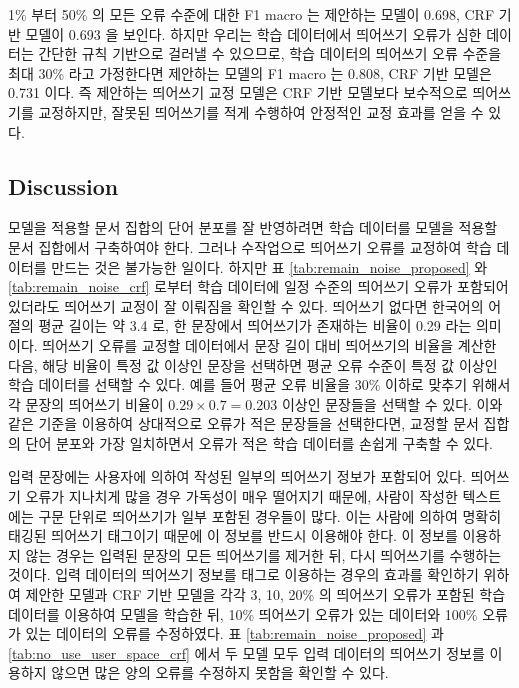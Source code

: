 \documentclass[11pt]{article}
\begin{document}
1\% 부터 50\% 의 모든 오류 수준에 대한 F1 macro 는 제안하는 모델이 0.698, CRF 기반 모델이 0.693 을 보인다.
하지만 우리는 학습 데이터에서 띄어쓰기 오류가 심한 데이터는 간단한 규칙 기반으로 걸러낼 수 있으므로, 학습 데이터의 띄어쓰기 오류 수준을 최대 30\% 라고 가정한다면 제안하는 모델의 F1 macro 는 0.808, CRF 기반 모델은 0.731 이다.
즉 제안하는 띄어쓰기 교정 모델은 CRF 기반 모델보다 보수적으로 띄어쓰기를 교정하지만, 잘못된 띄어쓰기를 적게 수행하여 안정적인 교정 효과를 얻을 수 있다.

\subsection{Discussion}

모델을 적용할 문서 집합의 단어 분포를 잘 반영하려면 학습 데이터를 모델을 적용할 문서 집합에서 구축하여야 한다.
그러나 수작업으로 띄어쓰기 오류를 교정하여 학습 데이터를 만드는 것은 불가능한 일이다.
하지만 표 \ref{tab:remain_noise_proposed} 와 \ref{tab:remain_noise_crf} 로부터 학습 데이터에 일정 수준의 띄어쓰기 오류가 포함되어 있더라도 띄어쓰기 교정이 잘 이뤄짐을 확인할 수 있다.
띄어쓰기 없다면 한국어의 어절의 평균 길이는 약 3.4 로, 한 문장에서 띄어쓰기가 존재하는 비율이 0.29 라는 의미이다.
띄어쓰기 오류를 교정할 데이터에서 문장 길이 대비 띄어쓰기의 비율을 계산한 다음, 해당 비율이 특정 값 이상인 문장을 선택하면 평균 오류 수준이 특정 값 이상인 학습 데이터를 선택할 수 있다.
예를 들어 평균 오류 비율을 30\% 이하로 맞추기 위해서 각 문장의 띄어쓰기 비율이 $0.29 \times 0.7 = 0.203$ 이상인 문장들을 선택할 수 있다.
이와 같은 기준을 이용하여 상대적으로 오류가 적은 문장들을 선택한다면, 교정할 문서 집합의 단어 분포와 가장 일치하면서 오류가 적은 학습 데이터를 손쉽게 구축할 수 있다.

입력 문장에는 사용자에 의하여 작성된 일부의 띄어쓰기 정보가 포함되어 있다.
띄어쓰기 오류가 지나치게 많을 경우 가독성이 매우 떨어지기 때문에, 사람이 작성한 텍스트에는 구문 단위로 띄어쓰기가 일부 포함된 경우들이 많다.
이는 사람에 의하여 명확히 태깅된 띄어쓰기 태그이기 때문에 이 정보를 반드시 이용해야 한다.
이 정보를 이용하지 않는 경우는 입력된 문장의 모든 띄어쓰기를 제거한 뒤, 다시 띄어쓰기를 수행하는 것이다.
입력 데이터의 띄어쓰기 정보를 태그로 이용하는 경우의 효과를 확인하기 위하여 제안한 모델과 CRF 기반 모델을 각각 3, 10, 20\% 의 띄어쓰기 오류가 포함된 학습 데이터를 이용하여 모델을 학습한 뒤, 10\% 띄어쓰기 오류가 있는 데이터와 100\% 오류가 있는 데이터의 오류를 수정하였다.
표 \ref{tab:remain_noise_proposed} 과 \ref{tab:no_use_user_space_crf} 에서 두 모델 모두 입력 데이터의 띄어쓰기 정보를 이용하지 않으면 많은 양의 오류를 수정하지 못함을 확인할 수 있다.
\end{document}
